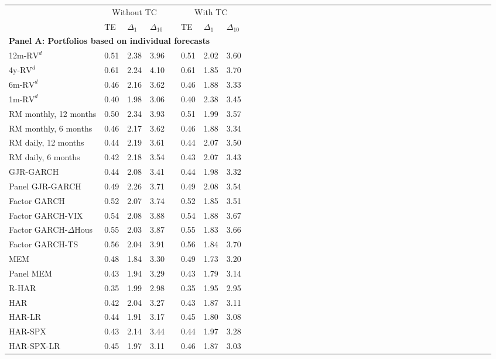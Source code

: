\begin{tabular}{llllllllllllllllllllllllllllllllllllll} 
\toprule 
 & \multicolumn{3}{c}{Without TC} & & \multicolumn{3}{c}{With TC} \\ 
 \cmidrule{2-4} \cmidrule{6-8} 
 & TE & $\Delta_1$ & $\Delta_{10}$ &  & TE & $\Delta_1$ & $\Delta_{10}$\\\midrule 
\multicolumn{7}{l}{\textbf{Panel A: Portfolios based on individual forecasts}}\\ \midrule 
12m-$\text{RV}^d$ & 0.51 & 2.38 & 3.96 & & 0.51 & 2.02 & 3.60\\ 
4y-$\text{RV}^d$ & 0.61 & 2.24 & 4.10 & & 0.61 & 1.85 & 3.70\\ 
6m-$\text{RV}^d$ & 0.46 & 2.16 & 3.62 & & 0.46 & 1.88 & 3.33\\ 
1m-$\text{RV}^d$ & 0.40 & 1.98 & 3.06 & & 0.40 & 2.38 & 3.45\\ 
\midrule 
RM monthly, 12 months & 0.50 & 2.34 & 3.93 & & 0.51 & 1.99 & 3.57\\ 
RM monthly, 6 months & 0.46 & 2.17 & 3.62 & & 0.46 & 1.88 & 3.34\\ 
RM daily, 12 months & 0.44 & 2.19 & 3.61 & & 0.44 & 2.07 & 3.50\\ 
RM daily, 6 months & 0.42 & 2.18 & 3.54 & & 0.43 & 2.07 & 3.43\\ 
\midrule 
GJR-GARCH & 0.44 & 2.08 & 3.41 & & 0.44 & 1.98 & 3.32\\ 
Panel GJR-GARCH & 0.49 & 2.26 & 3.71 & & 0.49 & 2.08 & 3.54\\ 
Factor GARCH & 0.52 & 2.07 & 3.74 & & 0.52 & 1.85 & 3.51\\ 
Factor GARCH-VIX & 0.54 & 2.08 & 3.88 & & 0.54 & 1.88 & 3.67\\ 
Factor GARCH-$\Delta$Hous & 0.55 & 2.03 & 3.87 & & 0.55 & 1.83 & 3.66\\ 
Factor GARCH-TS & 0.56 & 2.04 & 3.91 & & 0.56 & 1.84 & 3.70\\ 
MEM & 0.48 & 1.84 & 3.30 & & 0.49 & 1.73 & 3.20\\ 
Panel MEM & 0.43 & 1.94 & 3.29 & & 0.43 & 1.79 & 3.14\\ 
\midrule 
R-HAR & 0.35 & 1.99 & 2.98 & & 0.35 & 1.95 & 2.95\\ 
HAR & 0.42 & 2.04 & 3.27 & & 0.43 & 1.87 & 3.11\\ 
HAR-LR & 0.44 & 1.91 & 3.17 & & 0.45 & 1.80 & 3.08\\ 
HAR-SPX & 0.43 & 2.14 & 3.44 & & 0.44 & 1.97 & 3.28\\ 
HAR-SPX-LR & 0.45 & 1.97 & 3.11 & & 0.46 & 1.87 & 3.03\\ 

\end{tabular}
